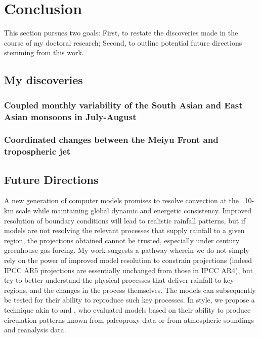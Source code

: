 \chapter{Conclusion}

This section pursues two goals: First, to restate the discoveries made in the course of my doctoral research; Second, to outline potential future directions stemming from this work.

\section{My discoveries}

\subsection{Coupled monthly variability of the South Asian and East Asian monsoons in July-August}

\subsection{Coordinated changes between the Meiyu Front and tropospheric jet}

\section{Future Directions}

	A new generation of computer models promises to resolve convection at the ~10-km scale while maintaining global dynamic and energetic consistency. Improved resolution of boundary conditions will lead to realistic rainfall patterns, but if models are not resolving the relevant processes that supply rainfall to a given region, the projections obtained cannot be trusted, especially under  century greenhouse gas forcing. My work suggests a pathway wherein we do not simply rely on the power of improved model resolution to constrain projections (indeed IPCC AR5 projections are essentially unchanged from those in IPCC AR4), but try to better understand the physical processes that deliver rainfall to key regions, and the changes in the process themselves. The models can subsequently be tested for their ability to reproduce such key processes. In style, we propose a technique akin to \cite{Boos} and \cite{Tierney}, who evaluated models based on their ability to produce circulation patterns known from paleoproxy data or from atmospheric soundings and reanalysis data.
	
